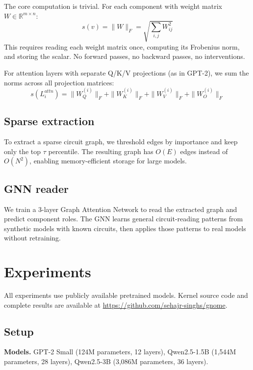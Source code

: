 \documentclass[11pt]{article}
\begin{document}
The core computation is trivial. For each component with weight matrix $W \in \mathbb{R}^{m \times n}$:
\begin{equation}
    s(v) = \|W\|_F = \sqrt{\sum_{i,j} W_{ij}^2}
\end{equation}
This requires reading each weight matrix once, computing its Frobenius norm, and storing the scalar. No forward passes, no backward passes, no interventions.

For attention layers with separate Q/K/V projections (as in GPT-2), we sum the norms across all projection matrices:
\begin{equation}
    s(L_i^{attn}) = \|W_Q^{(i)}\|_F + \|W_K^{(i)}\|_F + \|W_V^{(i)}\|_F + \|W_O^{(i)}\|_F
\end{equation}

\subsection{Sparse extraction}

To extract a sparse circuit graph, we threshold edges by importance and keep only the top $\tau$ percentile. The resulting graph has $O(E)$ edges instead of $O(N^2)$, enabling memory-efficient storage for large models.

\subsection{GNN reader}

We train a 3-layer Graph Attention Network \citep{velickovic2018graph} to read the extracted graph and predict component roles. The GNN learns general circuit-reading patterns from synthetic models with known circuits, then applies those patterns to real models without retraining.

\section{Experiments}

All experiments use publicly available pretrained models. Kernel source code and complete results are available at \url{https://github.com/sehajr-singhs/gnome}.

\subsection{Setup}

\textbf{Models.} GPT-2 Small \citep{radford2019language} (124M parameters, 12 layers), Qwen2.5-1.5B \citep{yang2024qwen2} (1,544M parameters, 28 layers), Qwen2.5-3B (3,086M parameters, 36 layers).
\end{document}
